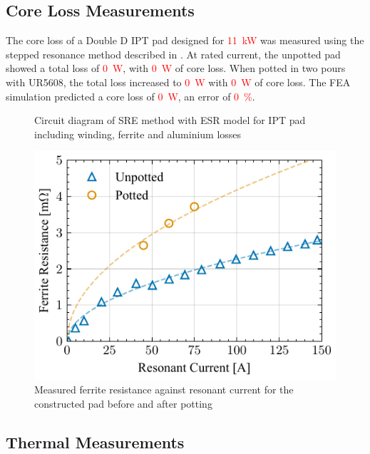 \documentclass[conference]{IEEEtran}
\begin{document}
\subsection{Core Loss Measurements}

The core loss of a Double D IPT pad designed for \textcolor{red}{\SI{11}{\kilo\watt}} was measured using the stepped resonance method described in \cite{kalraPowerLossMeasurement2020}.
At rated current, the unpotted pad showed a total loss of \textcolor{red}{\SI{0}{\watt}}, with \textcolor{red}{\SI{0}{\watt}} of core loss.
When potted in two pours with UR5608, the total loss increased to \textcolor{red}{\SI{0}{\watt}} with \textcolor{red}{\SI{0}{\watt}} of core loss. 
The FEA simulation predicted a core loss of \textcolor{red}{\SI{0}{\watt}}, an error of \textcolor{red}{\SI{0}{\percent}}. 

\lipsum[1]

\begin{figure}[t]
  
  \caption{Circuit diagram of SRE method with ESR model for IPT pad including winding, ferrite and aluminium losses}
  \label{fig:sremethodcircuitdiagram}
\end{figure}

\begin{figure}[t]
  \includegraphics{figures/24-10-17_initialFerriteResistanceComparisonV2.pdf}
  \caption{Measured ferrite resistance against resonant current for the constructed pad before and after potting}
  \label{fig:initialFerriteResistanceComparison}
\end{figure}

\subsection{Thermal Measurements}
\end{document}
